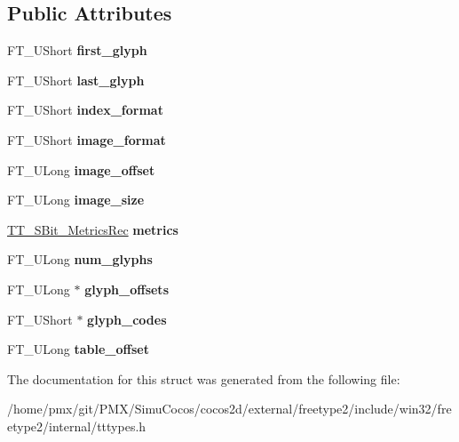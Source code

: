 \subsection*{Public Attributes}
\begin{DoxyCompactItemize}
\item 
\mbox{\label{structTT__SBit__RangeRec___a4593c489959cf2dfc775970d21f3162d}} 
F\+T\+\_\+\+U\+Short {\bfseries first\+\_\+glyph}
\item 
\mbox{\label{structTT__SBit__RangeRec___a1690b0033a710c685870da8aee88ae18}} 
F\+T\+\_\+\+U\+Short {\bfseries last\+\_\+glyph}
\item 
\mbox{\label{structTT__SBit__RangeRec___a6b5d74c7fb4b8bf54d40ca231bdb42da}} 
F\+T\+\_\+\+U\+Short {\bfseries index\+\_\+format}
\item 
\mbox{\label{structTT__SBit__RangeRec___a8925a35b94f8aa9cdf76f60f4e3293a0}} 
F\+T\+\_\+\+U\+Short {\bfseries image\+\_\+format}
\item 
\mbox{\label{structTT__SBit__RangeRec___ae722956e1271128a44764e6126437c23}} 
F\+T\+\_\+\+U\+Long {\bfseries image\+\_\+offset}
\item 
\mbox{\label{structTT__SBit__RangeRec___ad9ccb1529468dfcaf9e7a8946611413f}} 
F\+T\+\_\+\+U\+Long {\bfseries image\+\_\+size}
\item 
\mbox{\label{structTT__SBit__RangeRec___a79be8a9d51100d82b2d9582db861157a}} 
\hyperlink{structTT__SBit__MetricsRec__}{T\+T\+\_\+\+S\+Bit\+\_\+\+Metrics\+Rec} {\bfseries metrics}
\item 
\mbox{\label{structTT__SBit__RangeRec___afd9437150f8d9f784f98da6d61223464}} 
F\+T\+\_\+\+U\+Long {\bfseries num\+\_\+glyphs}
\item 
\mbox{\label{structTT__SBit__RangeRec___a04002d33ad87100fc607cd257efeeb3f}} 
F\+T\+\_\+\+U\+Long $\ast$ {\bfseries glyph\+\_\+offsets}
\item 
\mbox{\label{structTT__SBit__RangeRec___a1b220ec573cc2b4f1b2db23b4393ef62}} 
F\+T\+\_\+\+U\+Short $\ast$ {\bfseries glyph\+\_\+codes}
\item 
\mbox{\label{structTT__SBit__RangeRec___a54457937305b5ccf895f5b23c0cc6006}} 
F\+T\+\_\+\+U\+Long {\bfseries table\+\_\+offset}
\end{DoxyCompactItemize}


The documentation for this struct was generated from the following file\+:\begin{DoxyCompactItemize}
\item 
/home/pmx/git/\+P\+M\+X/\+Simu\+Cocos/cocos2d/external/freetype2/include/win32/freetype2/internal/tttypes.\+h\end{DoxyCompactItemize}
